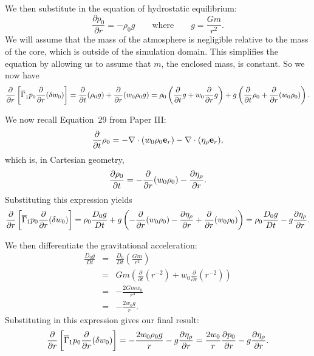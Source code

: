 We then substitute in the equation of hydrostatic equilibrium:
\[ \frac{\partial p_0}{\partial r} = -\rho_0 g \quad\quad \mbox{where} \quad\quad
   g = \frac{G m}{r^2}. \]
We will assume that the mass of the atmosphere is negligible relative to the
mass of the core, which is outside of the simulation domain.  This simplifies
the equation by allowing us to assume that $m$, the enclosed mass, is constant.
So we now have
\begin{equation}
\frac{\partial}{\partial r} \left[ \overline{\Gamma}_1 p_0 \frac{\partial}{\partial r}{({\delta w_0})} \right]
   = \frac{\partial}{\partial t}{({\rho_0 g}}) + \frac{\partial}{\partial r}{({w_0 \rho_0 g})}
   = \rho_0 \left ({\frac{\partial}{\partial t}{g} + w_0 \frac{\partial}{\partial r}{g}} \right )
         + g \left ({\frac{\partial}{\partial t}{\rho_0} + \frac{\partial}{\partial r}{({w_0 \rho_0})}} \right ).
\end{equation}

We now recall Equation~29 from Paper III:
\[ \frac{\partial}{\partial t}{\rho_0} = - \nabla \cdot ({w_0 \rho_0 \mathbf{e}_r})
                  - \nabla \cdot ({\eta_{\rho} \mathbf{e}_r}), \]
which is, in Cartesian geometry,
\begin{equation}
\frac{\partial \rho_0}{\partial t} = - \frac{\partial}{\partial r}{({w_0 \rho_0})}
                  - \frac{\partial \eta_{\rho}}{\partial r}.
\end{equation}
Substituting this expression yields
\begin{equation}
\frac{\partial}{\partial r}{} \left[ \overline{\Gamma}_1 p_0 \frac{\partial}{\partial r}{({\delta w_0})} \right]
   = \rho_0 \frac{D_0 g}{D t} + g \left ({- \frac{\partial}{\partial r}{({w_0 \rho_0})} - \frac{\partial \eta_{\rho}}{\partial r} + \frac{\partial}{\partial r}{({w_0 \rho_0})}} \right)
   = \rho_0 \frac{D_0 g}{D t} - g \frac{\partial \eta_{\rho}}{\partial r}.
\end{equation}

We then differentiate the gravitational acceleration:
\begin{eqnarray}
\frac{D_0 g}{D t}
   & = & \frac{D_0}{Dt} \left ({\frac{G m}{r^2}} \right ) \nonumber \\
   & = & G m \left ({\frac{\partial}{\partial t}{({r^{-2}})} + w_0 \frac{\partial}{\partial r}{({r^{-2}})}} \right ) \nonumber \\
   & = & - \frac{2 G m w_0}{r^3} \nonumber \\
   & = & - \frac{2 w_0 g}{r}.
\end{eqnarray}
Substituting in this expression gives our final result:
\begin{equation}
\frac{\partial}{\partial r}{} \left[ \overline{\Gamma}_1 p_0 \frac{\partial}{\partial r}{({\delta w_0})} \right]
   = - \frac{2 w_0 \rho_0 g}{r} - g \frac{\partial \eta_{\rho}}{\partial r}
   = \frac{2 w_0}{r} \frac{\partial p_0}{\partial r} - g \frac{\partial \eta_{\rho}}{\partial r}.
\end{equation}

